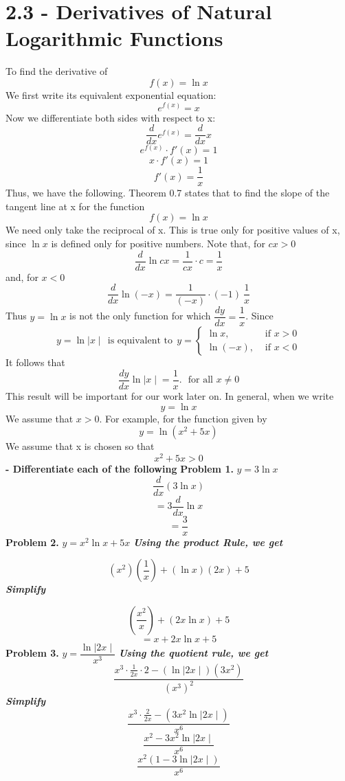 \documentclass{report}
\begin{document}
\section*{2.3 - Derivatives of Natural Logarithmic Functions}
To find the derivative of
$$ f(x) = \ln{x}$$
We first write its equivalent exponential equation:
$$ e^{f(x)} = x$$
Now we differentiate both sides with respect to x:
$$ \frac{d}{dx}e^{f(x)} = \frac{d}{dx}x$$
$$ e^{f(x)} \cdot f'(x) = 1$$
$$ x \cdot f'(x) = 1$$
$$ f'(x) = \dfrac{1}{x}$$
Thus, we have the following.
\bigbreak \noindent
{}
\bigbreak \noindent
Theorem 0.7 states that to find the slope of the tangent line at x for the function 
$$ f(x) = \ln{x}$$
We need only take the reciprocal of x. This is true only for positive values of x, since $\ln{x}$ is defined only for positive numbers. Note that, for $cx > 0$
$$ \frac{d}{dx}\ln{cx} = \dfrac{1}{cx} \cdot c = \dfrac{1}{x}$$
and, for $ x< 0$
$$ \frac{d}{dx}\ln{(-x)} = \dfrac{1}{(-x)} \cdot (-1) \ \dfrac{1}{x}$$
Thus $ y = \ln{x}$ is not the only function for which $\dfrac{dy}{dx} = \dfrac{1}{x}$. Since 
$$ y = \ln{\mid x \mid} \ \  \text{is equivalent to} \ \ y= \begin{cases}\ln x, & \text { if } x>0 \\ \ln (-x), & \text { if } x<0\end{cases}$$
It follows that
$$ \dfrac{dy}{dx} \ln{\mid x \mid} = \dfrac{1}{x}. \ \ \ \text{for all } x \neq 0$$
\bigbreak \noindent
This result will be important for our work later on. In general, when we write 
$$ y = \ln{x}$$
We assume that $ x>0$. For example, for the function given by
$$ y = \ln{(x^2 + 5x )}$$
We assume that x is chosen so that 
$$ x^2 + 5x > 0$$
\pagebreak
\q
\textbf{- Differentiate each of the following}
\bigbreak \noindent
\textbf{Problem 1.} $y=3\ln{x}$
$$ \frac{d}{dx}(3\ln{x})$$
$$ = 3 \frac{d}{dx}\ln{x}$$
$$ = \dfrac{3}{x}$$
\bigbreak \noindent
\textbf{Problem 2.} $ y=x^2\ln{x}+5x$
\bigbreak \noindent
\textit{\textbf{Using the product Rule, we get}}

$$ \left(x^2\right)\left(\frac{1}{x}\right) + (\ln{x})(2x) + 5$$
\textit{\textbf{Simplify}}

$$ \left(\dfrac{x^2}{x}\right) + (2x\ln{x}) + 5$$
$$ = x + 2x\ln{x} + 5 $$
\bigbreak \noindent
\textbf{Problem 3.} $y = \dfrac{\ln{\mid 2x \mid}}{x^3}$
\bigbreak \noindent
\textit{\textbf{Using the quotient rule, we get}}
$$ \dfrac{x^3 \cdot \frac{1}{2x} \cdot 2 - (\ln{\mid 2x\mid})(3x^2)}{(x^3)^2}$$
\textit{\textbf{Simplify}}
$$ \dfrac{x^3 \cdot \frac{2}{2x} - (3x^2\ln{\mid 2x\mid})}{x^6}$$
$$ \dfrac{x^2 - 3x^2\ln{\mid 2x\mid}}{x^6}$$
$$ \dfrac{x^2 \left(1 - 3\ln{\mid 2x\mid}\right)}{x^6}$$
\end{document}
